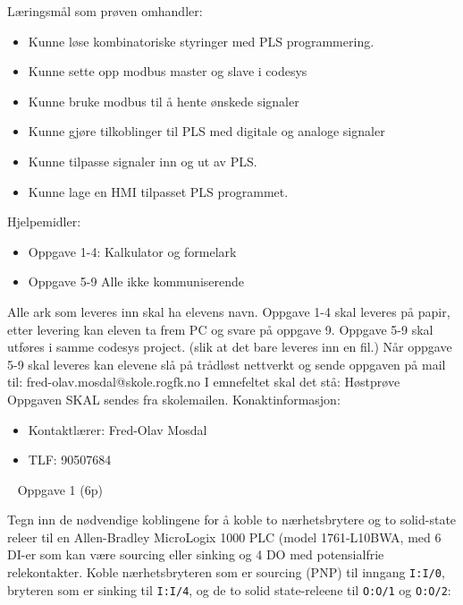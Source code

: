 Læringsmål som prøven omhandler:
\begin{itemize}[noitemsep]
\item 		Kunne løse kombinatoriske styringer med PLS programmering. 
\item 		Kunne sette opp modbus master og slave i codesys  
\item 		Kunne bruke modbus til å hente ønskede signaler 
\item 		Kunne gjøre tilkoblinger til PLS med digitale og analoge signaler 
\item 		Kunne tilpasse signaler inn og ut av PLS. 
\item 		Kunne lage en HMI tilpasset PLS programmet.  
\end{itemize}



\vskip 2.5pt 
Hjelpemidler:\begin{itemize}[noitemsep]
	\item Oppgave 1-4: Kalkulator og formelark
	\item Oppgave 5-9 Alle ikke kommuniserende
\end{itemize}

\vskip 5pt 
\vskip 10pt 
Alle ark som leveres inn skal ha elevens navn.
\vskip 2.5pt 
Oppgave 1-4 skal leveres på papir, etter levering kan eleven ta frem PC og svare på oppgave 9. 
\vskip 2.5pt 
Oppgave 5-9 skal utføres i samme codesys project. (slik at det bare leveres inn en fil.)
Når oppgave 5-9 skal leveres kan elevene slå på trådløst nettverkt og sende oppgaven på mail til:
\vskip 2.5pt 
fred-olav.mosdal@skole.rogfk.no
\vskip 2.5pt 
I emnefeltet skal det stå: Høstprøve
\vskip 2.5pt
Oppgaven SKAL sendes fra skolemailen. 
\vskip 2cm   
Konaktinformasjon:
\begin{itemize}[noitemsep]
	\item Kontaktlærer: Fred-Olav Mosdal
	\item TLF: 90507684
\end{itemize}


\vfil \eject
\newpage
\
\newpage
Oppgave 1 (6p)%
\vskip 2.5pt 

Tegn inn de nødvendige koblingene for å koble to nærhetsbrytere og to solid-state releer til en Allen-Bradley MicroLogix 1000 PLC (model 1761-L10BWA, med 6 DI-er som kan være sourcing eller sinking og 4 DO med potensialfrie relekontakter. Koble nærhetsbryteren som er sourcing (PNP) til inngang \texttt{I:I/0}, bryteren som er sinking til \texttt{I:I/4}, og de to solid state-releene til \texttt{O:O/1} og \texttt{O:O/2}:


